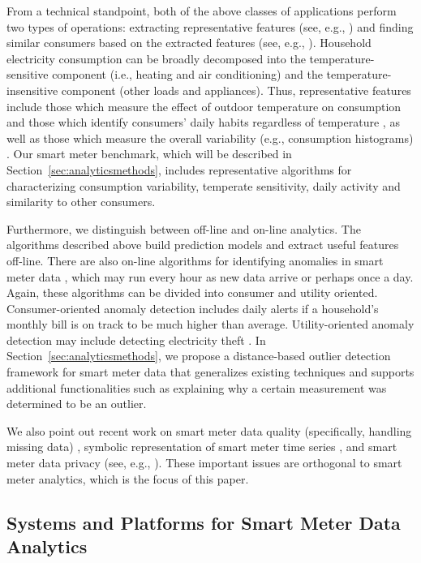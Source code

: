 \documentclass[prodmode,acmtods]{acmsmall}
\begin{document}
From a technical standpoint, both of the above classes of applications perform two types of operations: extracting representative features (see, e.g., \cite{omid,birt,espinoza,frv05}) and finding similar consumers based on the extracted features (see, e.g., \cite{acf12,chicco,rvn10,smith,tsekouras}).  Household electricity consumption can be broadly decomposed into the temperature-sensitive component (i.e., heating and air conditioning) and the temperature-insensitive component (other loads and appliances).  Thus, representative features include those which measure the effect of outdoor temperature on consumption \cite{albert_bigdata,birt,rvn10} and those which identify consumers' daily habits regardless of temperature \cite{acf12,omid,espinoza}, as well as those which measure the overall variability (e.g., consumption histograms) \cite{Gebru}.  Our smart meter benchmark, which will be described in Section~\ref{sec:analyticsmethods}, includes representative algorithms for characterizing consumption variability, temperate sensitivity, daily activity and similarity to other consumers.

Furthermore, we distinguish between off-line and on-line analytics.  The algorithms described above build prediction models and extract useful features off-line.  There are also on-line algorithms for identifying anomalies in smart meter data \cite{cc11,mc12}, which may run every hour as new data arrive or perhaps once a day.  Again, these algorithms can be divided into consumer and utility oriented.  Consumer-oriented anomaly detection includes daily alerts if a household's monthly bill is on track to be much higher than average.  Utility-oriented anomaly detection may include detecting electricity theft \cite{mc12}.  In Section~\ref{sec:analyticsmethods}, we propose a distance-based outlier detection framework for smart meter data that generalizes existing techniques and supports additional functionalities such as explaining why a certain measurement was determined to be an outlier.

We also point out recent work on smart meter data quality (specifically, handling missing data) \cite{jeng13}, symbolic representation of smart meter time series \cite{eek+15,wijaya13}, and smart meter data privacy (see, e.g., \cite{ac11,bbb+13,kbb15}).  These important issues are orthogonal to smart meter analytics, which is the focus of this paper.

\subsection{Systems and Platforms for Smart Meter Data Analytics}
\end{document}
